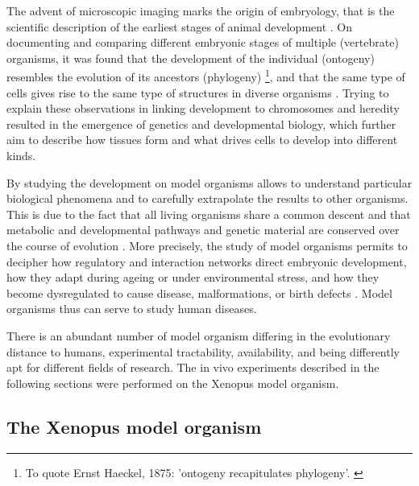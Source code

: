 \documentclass[
twoside,
openright,
titlepage,
numbers=noenddot,
headinclude,
fleqn,
a4paper,
footinclude=true,
cleardoublepage=empty,
abstractoff,
BCOR=5mm,
paper=a4,
fontsize=11pt,
british,ngerman,american,
]{scrreprt}
\begin{document}
The advent of microscopic imaging marks the origin of embryology, that
is the scientific description of the earliest stages of animal
development \cite{Wilson1895}.  On documenting and comparing different
embryonic stages of multiple (vertebrate) organisms, it was found that
the development of the individual (ontogeny) resembles the evolution
of its ancestors (phylogeny) \footnote{To quote Ernst Haeckel, 1875:
  'ontogeny recapitulates phylogeny'. \cite{Haeckel1874}}, and that
the same type of cells gives rise to the same type of structures in
diverse organisms \cite{Darwin1871,Wilson1895,Haeckel1874}.  Trying to
explain these observations in linking development to chromosomes and
heredity resulted in the emergence of genetics and developmental
biology, which further aim to describe how tissues form and what
drives cells to develop into different kinds.

By studying the development on model organisms allows to understand
particular biological phenomena and to carefully extrapolate the
results to other organisms.  This is due to the fact that all living
organisms share a common descent and that metabolic and developmental
pathways and genetic material are conserved over the course of
evolution \cite{DiCarlo2012}.  More precisely, the study of model
organisms permits to decipher how regulatory and interaction networks
direct embryonic development, how they adapt during ageing or under
environmental stress, and how they become dysregulated to cause
disease, malformations, or birth defects \cite{Xenbase}.  Model
organisms thus can serve to study human diseases.

There is an abundant number of model organism differing in the
evolutionary distance to humans, experimental tractability,
availability, and being differently apt for different fields of
research.  The in vivo experiments described in the following sections
were performed on the Xenopus model organism.


\subsection{The Xenopus model organism}
\label{sec:xeno}
\end{document}
